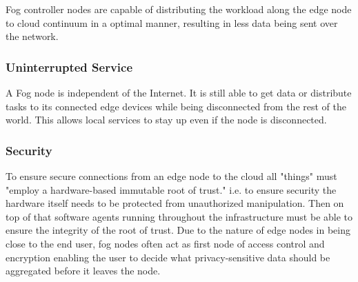 Fog controller nodes are capable of distributing the workload along the edge node to cloud continuum in a optimal manner, resulting in less data being sent over the network.


\subsubsection{Uninterrupted Service}

A Fog node is independent of the Internet. It is still able to get data or distribute tasks to its connected edge devices while being disconnected from the rest of the world. This allows local services to stay up even if the node is disconnected.

\subsubsection{Security}

To ensure secure connections from an edge node to the cloud all "things" must "employ a hardware-based immutable root of trust."\cite[p.10]{OpenFog} i.e. to ensure security the hardware itself needs to be protected from unauthorized manipulation. Then on top of that software agents running throughout the infrastructure must be able to ensure the integrity of the root of trust. Due to the nature of edge nodes in being close to the end user, fog nodes often act as first node of access control and encryption enabling the user to decide what privacy-sensitive data should be aggregated before it leaves the node.\cite[p.10]{OpenFog}